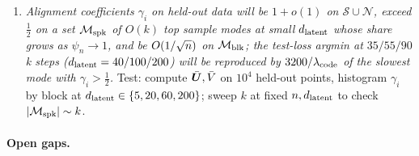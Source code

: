 \begin{enumerate}
\item \emph{Alignment coefficients $\gamma_i$ on held-out data will be $1+o(1)$ on $\mathcal S\cup\mathcal N$, exceed $\tfrac12$ on a set $\mathcal M_{\rm spk}$ of $O(k)$ top sample modes at small $d_{\mathrm{latent}}$ whose share grows as $\psi_n\to1$, and be $O(1/\sqrt{n})$ on $\mathcal M_{\rm blk}$; the test-loss argmin at $35/55/90$k steps ($d_{\mathrm{latent}}=40/100/200$) will be reproduced by $3200/\lambda_{\rm code}$ of the slowest mode with $\gamma_i>\tfrac12$.} Test: compute $\bar{\bm{U}},\bar V$ on $10^4$ held-out points, histogram $\gamma_i$ by block at $d_{\mathrm{latent}}\in\{5,20,60,200\}$; sweep $k$ at fixed $n,d_{\mathrm{latent}}$ to check $|\mathcal M_{\rm spk}|\sim k$.
\end{enumerate}

\paragraph{Open gaps.}
